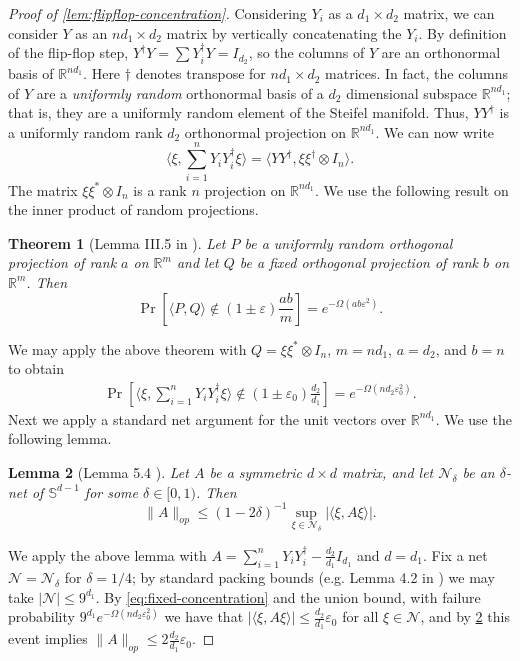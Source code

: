 \documentclass[aos]{imsart}
\newtheorem{theorem}{Theorem}[section]
\newtheorem{lemma}[theorem]{Lemma}
\theoremstyle{definition}
\numberwithin{equation}{section}
\newcommand{\R}{{\mathbb{R}}}
\renewcommand{\S}{\mathbb{S}}
\newcommand{\ot}{\otimes}
\newcommand{\eps}{\varepsilon}
\begin{document}
\begin{appendix}
\begin{proof}[Proof of \cref{lem:flipflop-concentration}]
 Considering $Y_i$ as a $d_1 \times d_2$ matrix, we can consider $Y$ as an $n d_1 \times d_2$ matrix by vertically concatenating the $Y_i$. By definition of the flip-flop step, $Y^\dagger Y = \sum Y_i^\dagger Y = I_{d_2}$, so the columns of $Y$ are an orthonormal basis of $\R^{n d_1}$. Here $\dagger$ denotes transpose for $nd_1 \times d_2$ matrices. In fact, the columns of $Y$ are a \emph{uniformly random} orthonormal basis of a $d_2$ dimensional subspace $\R^{n d_1}$; that is, they are a uniformly random element of the Steifel manifold. Thus, $Y Y^\dagger$ is a uniformly random rank $d_2$ orthonormal projection on $\R^{n d_1}$. We can now write 
 $$ \langle \xi,  \sum_{i = 1}^n Y_i Y_i^{\dagger} \xi \rangle = \langle YY^\dagger,  \xi \xi^\dagger \ot I_{n} \rangle.$$
The matrix $\xi \xi^{*} \otimes I_{n}$ is a rank $n$ projection on $\R^{n d_1}$. We use the following result on the inner product of random projections.

\begin{theorem} [Lemma III.5 in \cite{hayden2006aspects}] Let $P$ be a uniformly random orthogonal projection of rank $a$ on $\R^{m}$ and let $Q$ be a fixed orthogonal projection of rank $b$ on $\R^{m}$. Then
\[ \Pr \left[ \langle P, Q \rangle \not\in (1 \pm \eps) \frac{ab}{m} \right] = e^{ - \Omega( ab \eps^{2} ) }.  \]
\end{theorem}
We may apply the above theorem with $Q = \xi \xi^{*} \otimes I_{n}$, $m = n d_1$, $a = d_2$, and $b = n$ to obtain
\begin{gather}\Pr\left[ \langle \xi,  \sum_{i = 1}^n Y_i Y_i^{\dagger} \xi \rangle \not\in (1 \pm \eps_0) \frac{d_2}{ d_1} \right] = e^{ - \Omega( n d_2 \eps_0^{2} ) }. \label{eq:fixed-concentration} \end{gather}
Next we apply a standard net argument for the unit vectors over $\R^{nd_1}$. We use the following lemma. 
\begin{lemma}[Lemma 5.4 \cite{vershynin2010introduction}]\label{lem:versh-net} Let $A$ be a symmetric $d\times d$ matrix, and let $\mathcal{N}_\delta$ be an $\delta$-net of $\S^{d-1}$ for some $\delta \in [0,1)$. Then 
$$\|A\|_{op} \leq (1 - 2 \delta)^{-1} \sup_{\xi \in \mathcal{N}_\delta} | \langle \xi, A \xi \rangle|.$$ 
\end{lemma}
We apply the above lemma with $A = \sum_{i = 1}^n Y_i Y_i^{\dagger} - \frac{d_2}{d_1} I_{d_1}$ and $d = d_1$.
Fix a net $\mathcal{N} = \mathcal{N}_\delta$ for $\delta = 1/4$; by standard packing bounds (e.g. Lemma 4.2 in \cite{vershynin2010introduction}) we may take $|\mathcal{N}| \leq 9^{d_1}$. By \cref{eq:fixed-concentration} and the union bound, with failure probability $9^{d_1} e^{- \Omega (n d_2 \eps_0^2)}$ we have that $|\langle \xi , A \xi \rangle| \leq \frac{d_2}{d_1} \eps_0$ for all $\xi \in \mathcal{N}$, and by \cref{lem:versh-net} this event implies $\|A\|_{op} \leq 2  \frac{d_2}{d_1} \eps_0$. 


\end{proof}
\end{appendix}
\end{document}
